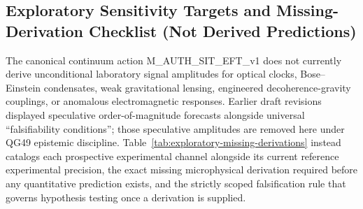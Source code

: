 \documentclass[american,11pt,letterpaper]{article}
\def\texttt#1{#1}%
\def\emph#1{#1}%
\begin{document}
\subsection{Exploratory Sensitivity Targets and Missing-Derivation Checklist (Not Derived Predictions)}

The canonical continuum action \texttt{M\_AUTH\_SIT\_EFT\_v1} does \emph{not} currently derive unconditional laboratory signal amplitudes for optical clocks, Bose--Einstein condensates, weak gravitational lensing, engineered decoherence-gravity couplings, or anomalous electromagnetic responses. Earlier draft revisions displayed speculative order-of-magnitude forecasts alongside universal ``falsifiability conditions''; those speculative amplitudes are removed here under \texttt{QG49} epistemic discipline. Table~\ref{tab:exploratory-missing-derivations} instead catalogs each prospective experimental channel alongside its current reference experimental precision, the exact missing microphysical derivation required before any quantitative prediction exists, and the strictly scoped falsification rule that governs hypothesis testing once a derivation is supplied.
\end{document}
